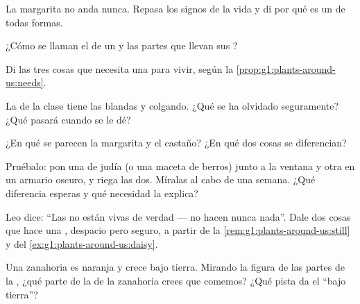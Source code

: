 \begin{exercise}[$\star$]\label{exo:g1:plants-around-us:3}
La margarita no anda nunca. Repasa los signos de la vida y di por qué
es un  de todas formas.
\end{exercise}

\begin{exercise}[$\star$]\label{exo:g1:plants-around-us:4}
¿Cómo se llaman el  de un  y las partes que llevan sus
?
\end{exercise}

\begin{exercise}[$\star$]\label{exo:g1:plants-around-us:5}
Di las tres cosas que necesita una  para vivir, según la
\cref{prop:g1:plants-around-us:needs}.
\end{exercise}

\begin{exercise}[$\star$]\label{exo:g1:plants-around-us:6}
La  de la clase tiene las  blandas y colgando. ¿Qué se ha
olvidado seguramente? ¿Qué pasará cuando se le dé?
\end{exercise}

\begin{exercise}[$\star$]\label{exo:g1:plants-around-us:7}
¿En qué se parecen la margarita y el castaño? ¿En qué dos cosas se
diferencian?
\end{exercise}

\begin{exercise}[$\star$]\label{exo:g1:plants-around-us:8}
Pruébalo: pon una  de judía (o una maceta de berros) junto a la
ventana y otra en un armario oscuro, y riega las dos. Míralas al cabo
de una semana. ¿Qué diferencia esperas y qué necesidad la explica?
\end{exercise}

\begin{exercise}[$\star\star$]\label{exo:g1:plants-around-us:9}
Leo dice: ``Las  no están vivas de verdad --- no hacen nunca
nada''. Dale dos cosas que hace una , despacio pero seguro, a
partir de la \cref{rem:g1:plants-around-us:still} y del
\cref{ex:g1:plants-around-us:daisy}.
\end{exercise}

\begin{exercise}[$\star\star$]\label{exo:g1:plants-around-us:10}
Una zanahoria es naranja y crece bajo tierra. Mirando la figura de las
partes de la , ¿qué parte de la  de la zanahoria crees que
comemos? ¿Qué pista da el ``bajo tierra''?
\end{exercise}
